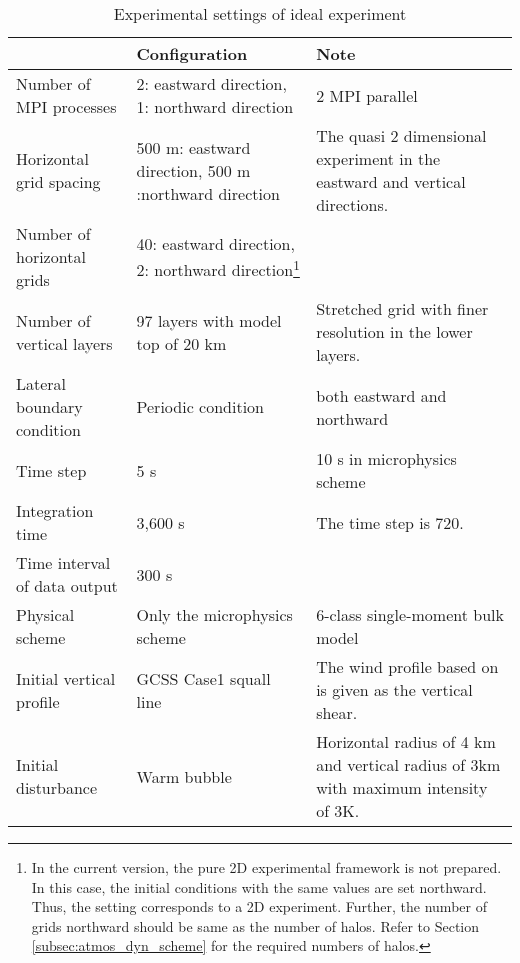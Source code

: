 \begin{table}[htb]
\begin{minipage}{150mm}
\begin{center}
\caption{Experimental settings of ideal experiment}
\begin{tabularx}{150mm}{|l|X|X|} \hline
 \rowcolor[gray]{0.9} ~~ & Configuration & Note \\ \hline
 Number of MPI processes& 2: eastward direction, 1: northward direction & 2 MPI parallel \\ \hline
 Horizontal grid spacing & 500 m: eastward direction, 500 m :northward direction & The quasi 2 dimensional experiment in the eastward and vertical directions. \\ \hline
 Number of horizontal grids & 40: eastward direction, 2: northward direction\footnote{In the current version, the pure 2D experimental framework is not prepared. In this case, the initial conditions with the same values are set northward. Thus, the setting corresponds to a 2D experiment. Further, the number of grids northward should be same as the number of halos. Refer to Section \ref{subsec:atmos_dyn_scheme} for the required numbers of halos.} &  \\ \hline
 Number of vertical layers & 97 layers with model top of 20 km & Stretched grid with finer resolution in the lower layers. \\ \hline
 Lateral boundary condition & Periodic condition & both eastward and northward \\ \hline
 Time step & 5 s      &  10 s in microphysics scheme\\ \hline
 Integration time     & 3,600 s & The time step is 720.\\ \hline
 Time interval of data output & 300 s  &  \\ \hline
 Physical scheme & Only the microphysics scheme &
 6-class single-moment bulk model \citep{tomita_2008} \\ \hline
 Initial vertical profile & GCSS Case1 squall line \citep{Redelsperger2000}&
 The wind profile based on \citet{Ooyama_2001} is given as the vertical shear. \\ \hline
 Initial disturbance & Warm bubble & Horizontal radius of 4 km and
 vertical radius of 3km with  maximum intensity of 3K.\\ \hline
\end{tabularx}
\label{tab:setting_ideal}
\end{center}
\end{minipage}
\end{table}


